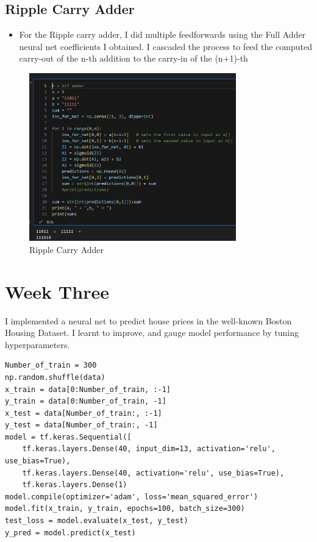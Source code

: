 \documentclass[12pt,a4paper]{article}
\begin{document}
\subsection{Ripple Carry Adder}
\begin{itemize}
\item For the Ripple carry adder, I did multiple feedforwards using the Full Adder neural net coefficients I obtained. I cascaded the process to feed the computed carry-out of the n-th addition to the carry-in of the (n+1)-th
\end{itemize}
\begin{figure}[h!]
    \centering
    \includegraphics[width=0.8\textwidth]{ripple} 
    \caption{Ripple Carry Adder}
    \label{fig:example}
\end{figure}
\pagebreak
\section{Week Three}
I implemented a neural net to predict house prices in the well-known Boston Housing Dataset. I learnt to improve, and gauge model performance by tuning hyperparameters.
\begin{lstlisting}
Number_of_train = 300
np.random.shuffle(data)
x_train = data[0:Number_of_train, :-1]
y_train = data[0:Number_of_train, -1]
x_test = data[Number_of_train:, :-1]
y_test = data[Number_of_train:, -1]
model = tf.keras.Sequential([
    tf.keras.layers.Dense(40, input_dim=13, activation='relu', use_bias=True),
    tf.keras.layers.Dense(40, activation='relu', use_bias=True),
    tf.keras.layers.Dense(1)  
model.compile(optimizer='adam', loss='mean_squared_error')
model.fit(x_train, y_train, epochs=100, batch_size=300)
test_loss = model.evaluate(x_test, y_test)
y_pred = model.predict(x_test)
\end{lstlisting}
\end{document}
